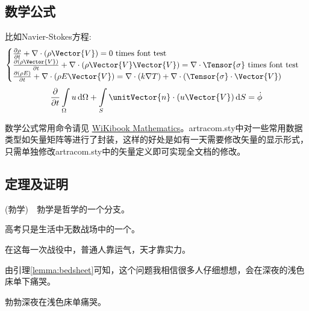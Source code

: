 \subsection{数学公式}

比如Navier-Stokes方程:
\begin{equation} \label{eq:ns}
    \begin{cases}
        \frac{\partial \rho}{\partial t} + \nabla\cdot(\rho\Vector{V}) = 0 \ \mathrm{times\ font\ test}\\
        \frac{\partial (\rho\Vector{V})}{\partial t} + \nabla\cdot(\rho\Vector{V}\Vector{V}) = \nabla\cdot\Tensor{\sigma} \ \text{times font test}\\
        \frac{\partial (\rho E)}{\partial t} + \nabla\cdot(\rho E\Vector{V}) = \nabla\cdot(k\nabla T) + \nabla\cdot(\Tensor{\sigma}\cdot\Vector{V})
    \end{cases}
\end{equation}
\begin{equation}
    \frac{\partial }{\partial t}\int\limits_{\Omega} u \, \mathrm{d}\Omega + \int\limits_{S} \unitVector{n}\cdot(u\Vector{V}) \, \mathrm{d}S = \dot{\phi}
\end{equation}

数学公式常用命令请见 \href{https://en.wikibooks.org/wiki/LaTeX/Mathematics}{WiKibook Mathematics}。artracom.sty中对一些常用数据类型如矢量矩阵等进行了封装，这样的好处是如有一天需要修改矢量的显示形式，只需单独修改artracom.sty中的矢量定义即可实现全文档的修改。
\subsection{定理及证明}
\begin{defn}
    (勃学)　勃学是哲学的一个分支。
\end{defn}

\begin{prop}
    高考只是生活中无数战场中的一个。
\end{prop}

\begin{thm}
    在这每一次战役中，普通人靠运气，天才靠实力。
\end{thm}

\begin{pf}
    由引理\ref{lemma:bedsheet}可知，这个问题我相信很多人仔细想想，会在深夜的浅色床单下痛哭。
\end{pf}

\begin{cor}
    勃勃深夜在浅色床单痛哭。
\end{cor}

